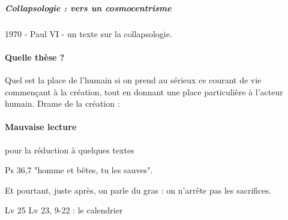 \subparagraph{Collapsologie : vers un cosmocentrisme}
1970 - Paul VI - un texte sur la collapsologie.

\paragraph{Quelle thèse ? } Quel est la place de l'humain si on prend au sérieux ce courant de vie commençant à la création, tout en donnant une place particulière à l'acteur humain. 
Drame de la création : 


\paragraph{Mauvaise lecture} pour la réduction à quelques textes 
\begin{Ex}
Ps 36,7 "homme et bêtes, tu les sauves".
    
\end{Ex}
Et pourtant, juste après, on parle du gras : on n'arrête pas les sacrifices.

Lv 25
Lv 23, 9-22 : le calendrier 

